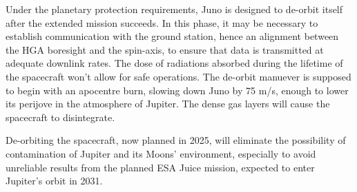 Under the planetary protection requirements, Juno is designed to de-orbit itself after the extended mission succeeds. %
In this phase, it may be necessary to establish communication with the ground station, hence an alignment between the HGA boresight and the spin-axis, to ensure that data is transmitted at adequate downlink rates.%
 The dose of radiations absorbed during the lifetime of the spacecraft won't allow for safe operations. The de-orbit manuever is supposed to begin with an apocentre burn, slowing down Juno by 75 m/s, enough to lower its perijove in the atmosphere of Jupiter. The dense gas layers will cause the spacecraft to disintegrate.

De-orbiting the spacecraft, now planned in 2025, will eliminate the possibility of contamination of Jupiter and its Moons' environment, especially to avoid unreliable results from the planned ESA Juice mission, expected to enter Jupiter's orbit in 2031. \cite{NASA2} \cite{NASA1}